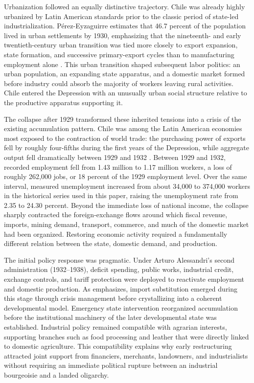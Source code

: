 Urbanization followed an equally distinctive trajectory. Chile was already highly urbanized by Latin American standards prior to the classic period of state-led industrialization. P\'erez-Eyzaguirre estimates that 46.7 percent of the population lived in urban settlements by 1930, emphasizing that the nineteenth- and early twentieth-century urban transition was tied more closely to export expansion, state formation, and successive primary-export cycles than to manufacturing employment alone \citep{PerezEyzaguirre2017}. This urban transition shaped subsequent labor politics: an urban population, an expanding state apparatus, and a domestic market formed before industry could absorb the majority of workers leaving rural activities. Chile entered the Depression with an unusually urban social structure relative to the productive apparatus supporting it.

The collapse after 1929 transformed these inherited tensions into a crisis of the existing accumulation pattern. Chile was among the Latin American economies most exposed to the contraction of world trade: the purchasing power of exports fell by roughly four-fifths during the first years of the Depression, while aggregate output fell dramatically between 1929 and 1932 \citep{BertolaOcampo2012,BulmerThomas2003}. Between 1929 and 1932, recorded employment fell from 1.43 million to 1.17 million workers, a loss of roughly 262,000 jobs, or 18 percent of the 1929 employment level. Over the same interval, measured unemployment increased from about 34,000 to 374,000 workers in the historical series used in this paper, raising the unemployment rate from 2.35 to 24.30 percent. Beyond the immediate loss of national income, the collapse sharply contracted the foreign-exchange flows around which fiscal revenue, imports, mining demand, transport, commerce, and much of the domestic market had been organized. Restoring economic activity required a fundamentally different relation between the state, domestic demand, and production.

The initial policy response was pragmatic. Under Arturo Alessandri's second administration (1932--1938), deficit spending, public works, industrial credit, exchange controls, and tariff protection were deployed to reactivate employment and domestic production. As \citet{Silva2007} emphasizes, import substitution emerged during this stage through crisis management before crystallizing into a coherent developmental model. Emergency state intervention reorganized accumulation before the institutional machinery of the later developmental state was established. Industrial policy remained compatible with agrarian interests, supporting branches such as food processing and leather that were directly linked to domestic agriculture. This compatibility explains why early restructuring attracted joint support from financiers, merchants, landowners, and industrialists without requiring an immediate political rupture between an industrial bourgeoisie and a landed oligarchy.


